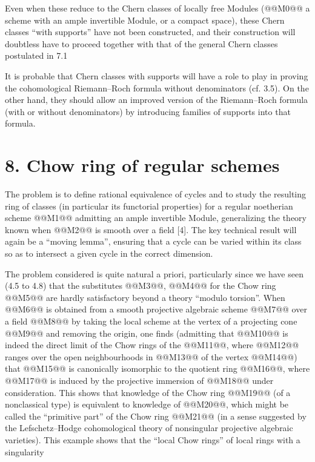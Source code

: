 Even when these reduce to the Chern classes of locally free Modules (@@M0@@ a scheme with an ample invertible Module, or a compact space), these Chern classes ``with supports'' have not been constructed, and their construction will doubtless have to proceed together with that of the general Chern classes postulated in 7.1

It is probable that Chern classes with supports will have a role to play in proving the cohomological Riemann--Roch formula without denominators (cf. 3.5). On the other hand, they should allow an improved version of the Riemann--Roch formula (with or without denominators) by introducing families of supports into that formula.

\section*{8. Chow ring of regular schemes}

The problem is to define rational equivalence of cycles and to study the resulting ring of classes (in particular its functorial properties) for a regular noetherian scheme @@M1@@ admitting an ample invertible Module, generalizing the theory known when @@M2@@ is smooth over a field [4]. The key technical result will again be a ``moving lemma'', ensuring that a cycle can be varied within its class so as to intersect a given cycle in the correct dimension.

The problem considered is quite natural a priori, particularly since we have seen (4.5 to 4.8) that the substitutes @@M3@@, @@M4@@ for the Chow ring @@M5@@ are hardly satisfactory beyond a theory ``modulo torsion''. When @@M6@@ is obtained from a smooth projective algebraic scheme @@M7@@ over a field @@M8@@ by taking the local scheme at the vertex of a projecting cone @@M9@@ and removing the origin, one finds (admitting that @@M10@@ is indeed the direct limit of the Chow rings of the @@M11@@, where @@M12@@ ranges over the open neighbourhoods in @@M13@@ of the vertex @@M14@@) that @@M15@@ is canonically isomorphic to the quotient ring @@M16@@, where @@M17@@ is induced by the projective immersion of @@M18@@ under consideration. This shows that knowledge of the Chow ring @@M19@@ (of a nonclassical type) is equivalent to knowledge of @@M20@@, which might be called the ``primitive part'' of the Chow ring @@M21@@ (in a sense suggested by the Lefschetz--Hodge cohomological theory of nonsingular projective algebraic varieties). This example shows that the ``local Chow rings'' of local rings with a singularity
